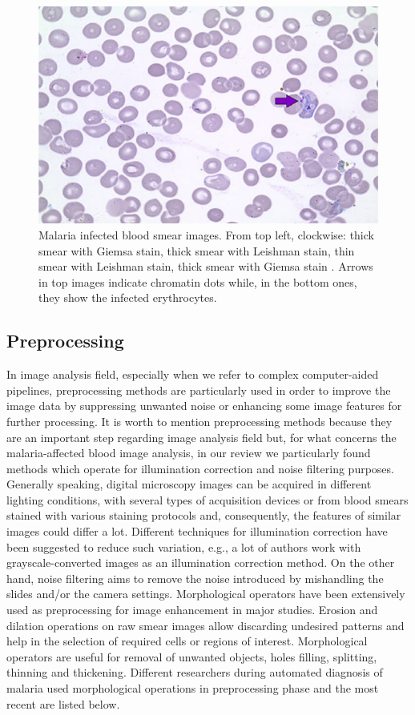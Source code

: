 \documentclass[sensors,review,submit,moreauthors,pdftex,10pt,a4paper]{mdpi}
\begin{document}
\begin{figure}[!t]
	\includegraphics[height=0.15\textheight]{img/f3_ThinLeishman}
	\caption{\label{fig:thick_thin_film}Malaria infected blood smear images. From top left, clockwise: thick smear with Giemsa stain, thick smear with Leishman stain, thin smear with Leishman stain, thick smear with Giemsa stain \cite{Das2015}. Arrows in top images indicate chromatin dots while, in the bottom ones, they show the infected erythrocytes.}
\end{figure}

\subsection{Preprocessing}
In image analysis field, especially when we refer to complex computer-aided pipelines, preprocessing methods are particularly used in order to improve the image data by suppressing unwanted noise or enhancing some image features for further processing.
It is worth to mention preprocessing methods because they are an important step regarding image analysis field but, for what concerns the malaria-affected blood image analysis, in our review we particularly found methods which operate for illumination correction and noise filtering purposes.
Generally speaking, digital microscopy images can be acquired in different lighting conditions, with several types of acquisition devices or from blood smears stained with various staining protocols and, consequently, the features of similar images could differ a lot.
Different techniques for illumination correction have been suggested to reduce such variation, e.g., a lot of authors work with grayscale-converted images as an illumination correction method.
On the other hand, noise filtering aims to remove the noise introduced by mishandling the slides and/or the camera settings.
Morphological operators have been extensively used as preprocessing for image enhancement in major studies.
Erosion and dilation operations on raw smear images allow discarding undesired patterns and help in the selection of required cells or regions of interest. Morphological operators are useful for removal of unwanted
objects, holes filling, splitting, thinning and thickening. Different researchers during automated diagnosis of malaria used morphological operations in preprocessing phase and the most recent are listed below.
\end{document}
